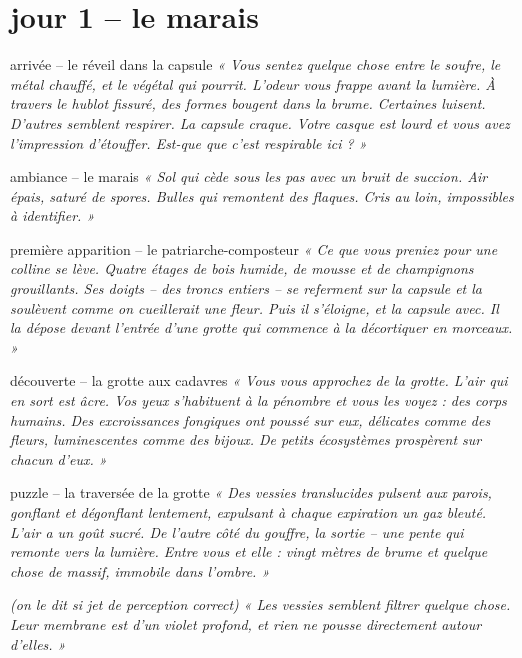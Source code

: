 \documentclass[10pt, a4paper]{article}
\begin{document}
\vspace{0.5cm}

\section*{jour 1 -- le marais}

\begin{zonebox}{arrivée -- le réveil dans la capsule}
\textit{« Vous sentez quelque chose entre le soufre, le métal chauffé, et le végétal qui pourrit. L'odeur vous frappe avant la lumière. À travers le hublot fissuré, des formes bougent dans la brume. Certaines luisent. D'autres semblent respirer. La capsule craque. Votre casque est lourd et vous avez l'impression d'étouffer. Est-que que c'est respirable ici ? »}
\end{zonebox}

\begin{zonebox}{ambiance -- le marais}
\textit{« Sol qui cède sous les pas avec un bruit de succion. Air épais, saturé de spores. Bulles qui remontent des flaques. Cris au loin, impossibles à identifier. »}
\end{zonebox}

\begin{creaturebox}{première apparition -- le patriarche-composteur}
\textit{« Ce que vous preniez pour une colline se lève. Quatre étages de bois humide, de mousse et de champignons grouillants. Ses doigts -- des troncs entiers -- se referment sur la capsule et la soulèvent comme on cueillerait une fleur. Puis il s'éloigne, et la capsule avec. Il la dépose devant l'entrée d'une grotte qui commence à la décortiquer en morceaux. »}
\end{creaturebox}

\begin{obstaclebox}{découverte -- la grotte aux cadavres}
\textit{« Vous vous approchez de la grotte. L'air qui en sort est âcre. Vos yeux s'habituent à la pénombre et vous les voyez : des corps humains. Des excroissances fongiques ont poussé sur eux, délicates comme des fleurs, luminescentes comme des bijoux. De petits écosystèmes prospèrent sur chacun d'eux. »}
\end{obstaclebox}

\begin{puzzlebox}{puzzle -- la traversée de la grotte}
\textit{« Des vessies translucides pulsent aux parois, gonflant et dégonflant lentement, expulsant à chaque expiration un gaz bleuté. L'air a un goût sucré. De l'autre côté du gouffre, la sortie -- une pente qui remonte vers la lumière. Entre vous et elle : vingt mètres de brume et quelque chose de massif, immobile dans l'ombre. »}

\textit{(on le dit si jet de perception correct)} \textit{« Les vessies semblent filtrer quelque chose. Leur membrane est d'un violet profond, et rien ne pousse directement autour d'elles. »}
\end{puzzlebox}
\end{document}
